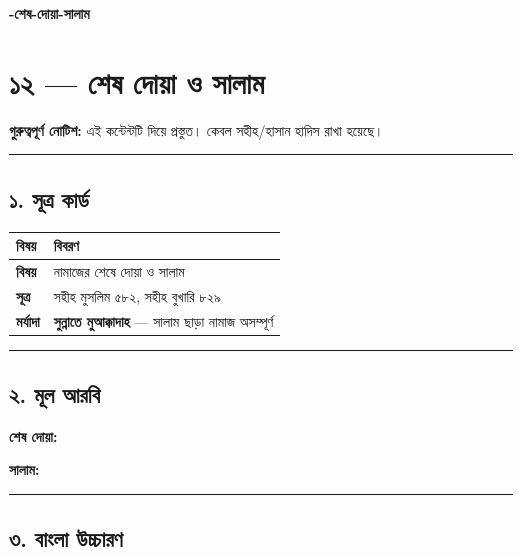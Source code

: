 

\begin{center}{\Large\bfseries\color{emerald} -শেষ-দোয়া-সালাম}\end{center}
\vspace{1em}
\section*{১২ — শেষ দোয়া ও সালাম}

\begin{warnbox}
 \textbf{গুরুত্বপূর্ণ নোটিশ:} এই কন্টেন্টটি  দিয়ে প্রস্তুত। কেবল সহীহ/হাসান হাদিস রাখা হয়েছে।
\end{warnbox}

\medskip\hrule\medskip

\subsection*{১. সূত্র কার্ড}

\begin{table}[h]\centering\small
\begin{tabular}{ll}
বিষয় & বিবরণ \\
\hline
\textbf{বিষয়} & নামাজের শেষে দোয়া ও সালাম \\
\textbf{সূত্র} & সহীহ মুসলিম ৫৮২, সহীহ বুখারি ৮২৯ \\
\textbf{মর্যাদা} & \textbf{সুন্নাতে মুআক্কাদাহ} — সালাম ছাড়া নামাজ অসম্পূর্ণ \\
\hline
\end{tabular}
\end{table}

\medskip\hrule\medskip

\subsection*{২. মূল আরবি}

\textbf{শেষ দোয়া:}       

\textbf{সালাম:}    

\medskip\hrule\medskip

\subsection*{৩. বাংলা উচ্চারণ}

